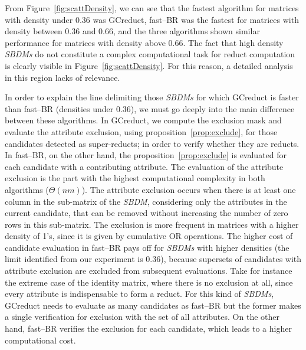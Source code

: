 \documentclass[number,preprint,review,12pt]{elsarticle}
\begin{document}
	From Figure~\ref{fig:scattDensity}, we can see that the fastest algorithm for matrices with density under 0.36 was GCreduct, fast--BR was the fastest for matrices with density between 0.36 and 0.66, and the three algorithms shown similar performance for matrices with density above 0.66. The fact that high density \textit{SBDMs} do not constitute a complex computational task for reduct computation \citep{Rojas12} is clearly visible in Figure~\ref{fig:scattDensity}. For this reason, a detailed analysis in this region lacks of relevance.
		
	In order to explain the line delimiting those \textit{SBDMs} for which GCreduct is faster than fast--BR (densities under 0.36), we must go deeply into the main difference between these algorithms. In GCreduct, we compute the exclusion mask and evaluate the attribute exclusion, using proposition~\ref{prop:exclude}, for those candidates detected as super-reducts; in order to verify whether they are reducts. In fast--BR, on the other hand, the proposition~\ref{prop:exclude} is evaluated for each candidate with a contributing attribute. The evaluation of the attribute exclusion is the part with the highest computational complexity in both algorithms ($\Theta (nm)$). The attribute exclusion occurs when there is at least one column in the sub-matrix of the \textit{SBDM}, considering only the attributes in the current candidate, that can be removed without increasing the number of zero rows in this sub-matrix. The exclusion is more frequent in matrices with a higher density of 1's, since it is given by cumulative OR operations. The higher cost of candidate evaluation in fast--BR pays off for \textit{SBDMs} with higher densities (the limit identified from our experiment is 0.36), because supersets of candidates with attribute exclusion are excluded from subsequent evaluations. Take for instance the extreme case of the identity matrix, where there is no exclusion at all, since every attribute is indispensable to form a reduct. For this kind of \textit{SBDMs}, GCreduct needs to evaluate as many candidates as fast--BR but the former makes a single verification for exclusion with the set of all attributes. On the other hand, fast--BR verifies the exclusion for each candidate, which leads to a higher computational cost.
	
\end{document}
